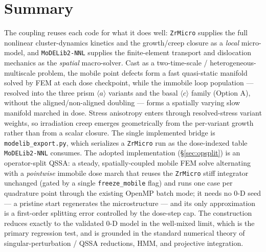 \documentclass[11pt]{article}
\newcommand{\ZrMicro}{\texttt{ZrMicro}}
\newcommand{\MoDELib}{\texttt{MoDELib2-NNL}}
\newcommand{\code}[1]{\texttt{#1}}
\begin{document}
\section{Summary}

The coupling reuses each code for what it does well: \ZrMicro{} supplies the full
nonlinear cluster-dynamics kinetics and the growth/creep closure as a
\emph{local} micro-model, and \MoDELib{} supplies the finite-element transport and
dislocation mechanics as the \emph{spatial} macro-solver. Cast as a
two-time-scale / heterogeneous-multiscale problem, the mobile point defects form
a fast quasi-static manifold solved by FEM at each dose checkpoint, while the
immobile loop population --- resolved into the three prism $\langle a\rangle$
variants and the basal $\langle c\rangle$ family (Option A), without the
aligned/non-aligned doubling --- forms a spatially varying slow manifold marched in
dose. Stress anisotropy enters through resolved-stress variant weights, so
irradiation creep emerges geometrically from the per-variant growth rather than
from a scalar closure. The single implemented bridge is
\code{modelib\_export.py}, which serializes a \ZrMicro{} run as the dose-indexed
table \MoDELib{} consumes. The adopted implementation (\S\ref{sec:opsplit}) is an
operator-split QSSA: a steady, spatially-coupled mobile FEM solve alternating
with a \emph{pointwise} immobile dose march that reuses the \ZrMicro{} stiff
integrator unchanged (gated by a single \code{freeze\_mobile} flag) and runs one
case per quadrature point through the existing OpenMP batch mode; it needs no 0-D
seed --- a pristine start regenerates the microstructure --- and its only
approximation is a first-order splitting error controlled by the dose-step cap.
The construction reduces exactly to the validated 0-D model in the well-mixed
limit, which is the primary regression test, and is grounded in the standard
numerical theory of singular-perturbation / QSSA reductions, HMM, and projective
integration.
\end{document}
